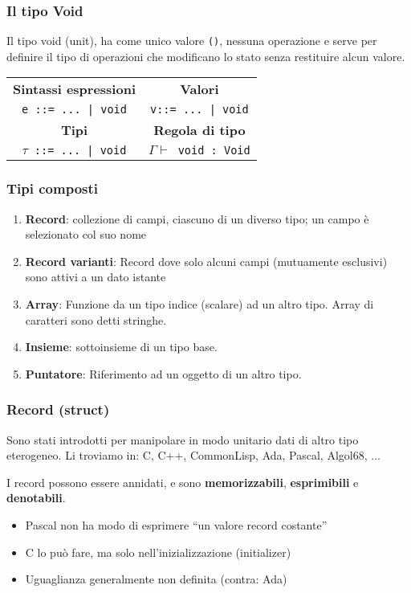 \documentclass[a4paper,10pt]{article}
\begin{document}
\subsubsection{Il tipo Void}
Il tipo void (unit), ha come unico valore \texttt{()}, nessuna operazione e serve per definire il tipo di operazioni che modificano lo stato senza restituire alcun valore.\smallskip
\begin{center}
 
\renewcommand{\arraystretch}{1.5}
\begin{tabular}{|c|c|}
\hline
 \textbf{Sintassi espressioni} & \textbf{Valori}\\
 \texttt{e ::= ... | void} & \texttt{v::= ... | void}\\
 \hline
 \textbf{Tipi} & \textbf{Regola di tipo}\\
 \texttt{$\tau$ ::= ... | void} & \texttt{$\Gamma \vdash$ void : Void}\\
 \hline
 \end{tabular}

\end{center}

\subsubsection{Tipi composti}
\begin{enumerate}
 \item \textbf{Record}: collezione di campi, ciascuno di un diverso tipo; un campo è selezionato col suo nome
 \item \textbf{Record varianti}: Record dove solo alcuni campi (mutuamente esclusivi) sono attivi a un dato istante
 \item \textbf{Array}: Funzione da un tipo indice (scalare) ad un altro tipo. Array di caratteri sono detti stringhe.
 \item \textbf{Insieme}: sottoinsieme di un tipo base.
 \item \textbf{Puntatore}: Riferimento ad un oggetto di un altro tipo.
\end{enumerate}

\subsubsection{Record (struct)}
Sono stati introdotti per manipolare in modo unitario dati di altro tipo eterogeneo. Li troviamo in: C, C++, CommonLisp, Ada, Pascal, Algol68, ...\smallskip

I record possono essere annidati, e sono \textbf{memorizzabili}, \textbf{esprimibili} e \textbf{denotabili}.\smallskip
\begin{itemize}
 \item Pascal non ha modo di esprimere “un valore record costante”
 \item C lo può fare, ma solo nell’inizializzazione (initializer)
\item Uguaglianza generalmente non definita (contra: Ada)

\end{itemize}
\end{document}
